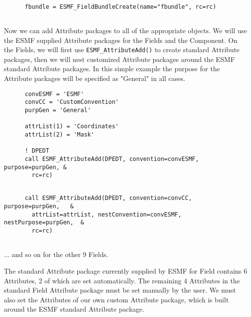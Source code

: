  \begin{verbatim}

      fbundle = ESMF_FieldBundleCreate(name="fbundle", rc=rc)
 
\end{verbatim}
 

      Now we can add Attribute packages to all of the appropriate objects.
      We will use the ESMF supplied Attribute packages for the Fields and
      the Component.  On the Fields, we will first use
      {\tt ESMF\_AttributeAdd()} to create standard Attribute packages, then
      we will nest customized Attribute packages around the ESMF standard
      Attribute packages.  In this simple example the purpose for the Attribute packages will
      be specified as "General" in all cases. 

 \begin{verbatim}
      convESMF = 'ESMF'
      convCC = 'CustomConvention'
      purpGen = 'General'

      attrList(1) = 'Coordinates'
      attrList(2) = 'Mask'

      ! DPEDT
      call ESMF_AttributeAdd(DPEDT, convention=convESMF, purpose=purpGen, &
        rc=rc)
 
\end{verbatim}
 

 \begin{verbatim}
      call ESMF_AttributeAdd(DPEDT, convention=convCC, purpose=purpGen,   &
        attrList=attrList, nestConvention=convESMF, nestPurpose=purpGen,  &
        rc=rc)
 
\end{verbatim}
 

       ... and so on for the other 9 Fields.
  
       The standard Attribute package currently supplied by ESMF for
       Field contains 6 Attributes, 2 of which are set automatically.
       The remaining 4 Attributes in the standard Field Attribute
       package must be set manually by the user.   We must also
       set the Attributes of our own custom Attribute package, which
       is built around the ESMF standard Attribute package. 

